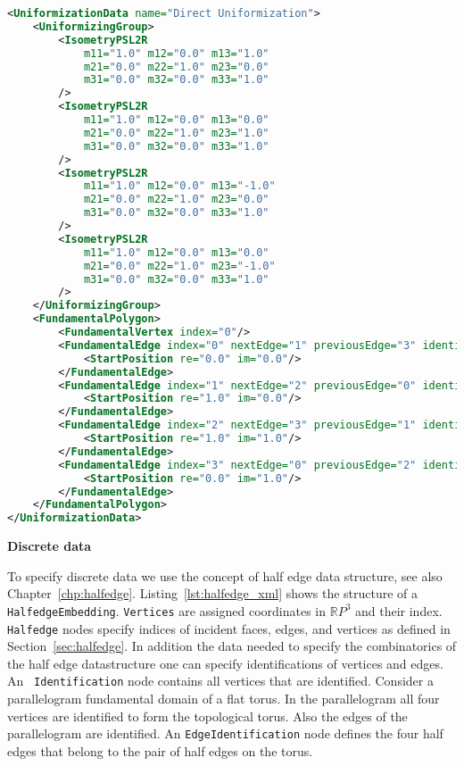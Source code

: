 \documentclass[Thesis.tex]{subfiles}
\begin{document}
\begin{lstlisting}[label=lst:fuchsian_xml, caption={A torus given by its Fuchsian uniformizing group and a corresponding fundamental polygon. The elements of the group are either euclidean motions or hyperbolic motions given as elements of $PSL(2, \mathbb R)$.}, numbers=none, language=XML, captionpos=b]
<UniformizationData name="Direct Uniformization">
	<UniformizingGroup>
		<IsometryPSL2R 
			m11="1.0" m12="0.0" m13="1.0" 
			m21="0.0" m22="1.0" m23="0.0" 
			m31="0.0" m32="0.0" m33="1.0"
		/>
		<IsometryPSL2R 
			m11="1.0" m12="0.0" m13="0.0" 
			m21="0.0" m22="1.0" m23="1.0" 
			m31="0.0" m32="0.0" m33="1.0"
		/>
		<IsometryPSL2R 
			m11="1.0" m12="0.0" m13="-1.0" 
			m21="0.0" m22="1.0" m23="0.0" 
			m31="0.0" m32="0.0" m33="1.0"
		/>
		<IsometryPSL2R 
			m11="1.0" m12="0.0" m13="0.0" 
			m21="0.0" m22="1.0" m23="-1.0" 
			m31="0.0" m32="0.0" m33="1.0"
		/>
	</UniformizingGroup>
	<FundamentalPolygon>
		<FundamentalVertex index="0"/>
		<FundamentalEdge index="0" nextEdge="1" previousEdge="3" identifiedEdge="2" startVertex="0">
			<StartPosition re="0.0" im="0.0"/>
		</FundamentalEdge>
		<FundamentalEdge index="1" nextEdge="2" previousEdge="0" identifiedEdge="3" startVertex="0">
			<StartPosition re="1.0" im="0.0"/>
		</FundamentalEdge>
		<FundamentalEdge index="2" nextEdge="3" previousEdge="1" identifiedEdge="0" startVertex="0">
			<StartPosition re="1.0" im="1.0"/>
		</FundamentalEdge>
		<FundamentalEdge index="3" nextEdge="0" previousEdge="2" identifiedEdge="1" startVertex="0">
			<StartPosition re="0.0" im="1.0"/>
		</FundamentalEdge>
	</FundamentalPolygon>
</UniformizationData>
\end{lstlisting}

{\bf Discrete data} 

To specify discrete data we use the concept of half edge data structure, see
also Chapter~\ref{chp:halfedge}. Listing~\ref{lst:halfedge_xml} shows the
structure of a {\tt HalfedgeEmbedding}. {\tt Vertices} are assigned coordinates
in $\mathbb RP^3$ and their index. {\tt Halfedge} nodes specify indices of
incident faces, edges, and vertices as defined in Section~\ref{sec:halfedge}.
In addition the data needed to specify the combinatorics of the half edge
datastructure one can specify identifications of vertices and edges. An {\tt
Identification} node contains all vertices that are identified. Consider a
parallelogram fundamental domain of a flat torus. In the parallelogram all four
vertices are identified to form the topological torus. Also the edges of the
parallelogram are identified. An {\tt EdgeIdentification} node defines the four
half edges that belong to the pair of half edges on the torus.
\end{document}
